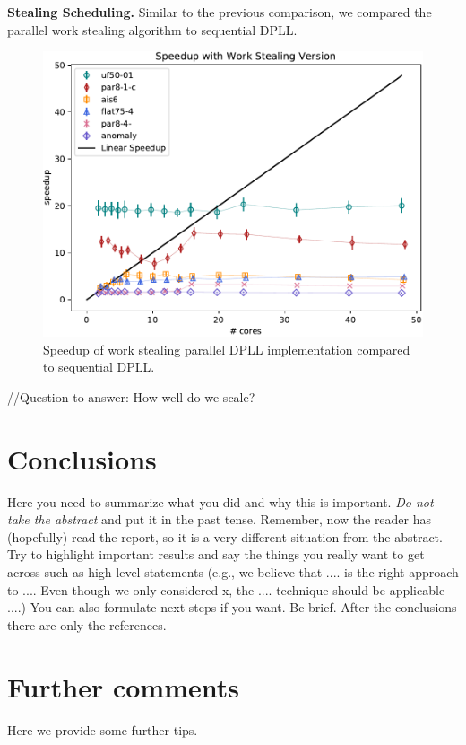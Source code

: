 \documentclass[letterpaper]{article}
\newcommand{\mypar}[1]{{\bf #1.}}
\begin{document}
\mypar{Stealing Scheduling}
Similar to the previous comparison, we compared the parallel work stealing algorithm to sequential DPLL.
\begin{figure}
  \centering
  \includegraphics[width=\columnwidth]{figures/dpll_scaling_stealing}
  \caption{Speedup of work stealing parallel DPLL implementation compared to sequential DPLL.
  \label{fig:dpll_stealing_speedup}}
\end{figure}
//Question to answer: How well do we scale?

\section{Conclusions}

Here you need to summarize what you did and why this is
important. {\em Do not take the abstract} and put it in the past
tense. Remember, now the reader has (hopefully) read the report, so it
is a very different situation from the abstract. Try to highlight
important results and say the things you really want to get across
such as high-level statements (e.g., we believe that .... is the right
approach to .... Even though we only considered x, the
.... technique should be applicable ....) You can also formulate next
steps if you want. Be brief. After the conclusions there are only the references.

\section{Further comments}

Here we provide some further tips.
\end{document}
